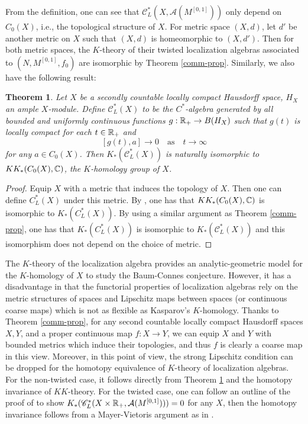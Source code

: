 \documentclass[11pt]{article}
\theoremstyle{definition}
\theoremstyle{plain}
\newtheorem{Thm}[Def]{Theorem}
\def\A{\mathcal A}\def\C{\mathcal C}\def\B{\mathcal B}\def\E{\mathcal E}\def\O{\mathcal O}\def\h{\mathfrak h}\def\K{\mathcal K}\def\F{\mathcal F}\def\P{\mathcal P}\def\L{\mathcal L}\def\R{\mathcal R}\def\Q{\mathcal Q}\def\H{\mathcal H}\def\S{\mathcal S}\def\N{\mathcal N}\def\U{\mathcal U}\def\V{\mathcal V}
\def\sC{\mathscr C}
\begin{document}
\begin{appendices}
From the definition, one can see that $\sC^*_L(X,\A(M^{[0,1]}))$ only depend on $C_0(X)$, i.e., the topological structure of $X$. For metric space $(X,d)$, let $d'$ be another metric on $X$ such that $(X,d)$ is homeomorphic to $(X,d')$. Then for both metric spaces, the $K$-theory of their twisted localization algebras associated to $(N, M^{[0,1]},f_0)$ are isomorphic by Theorem \ref{comm-prop}. Similarly, we also have the following result:

\begin{Thm}\label{non-coe comm-prop}
Let $X$ be a secondly countable locally compact Hausdorff space, $H_X$ an ample $X$-module. Define $\sC^*_L(X)$ to be the $C^*$-algebra generated by all bounded and uniformly continuous functions $g:\mathbb R_+\to B(H_X)$ such that $g(t)$ is locally compact for each $t\in\mathbb R_+$ and
$$[g(t),a]\to 0\quad\text{as}\quad t\to\infty$$
for any $a\in C_0(X)$. Then $K_*(\sC^*_L(X))$ is naturally isomorphic to $KK_*(C_0(X),\mathbb C)$, the $K$-homology group of $X$.
\end{Thm}

\begin{proof}
Equip $X$ with a metric that induces the topology of $X$. Then one can define $C^*_L(X)$ under this metric. By \cite[Theorem 3.5]{QR2010}, one has that $KK_*(C_0(X),\mathbb C)$ is isomorphic to $K_*(C^*_L(X))$. By using a similar argument as Theorem \ref{comm-prop}, one has that $K_*(C^*_L(X))$ is isomorphic to $K_*(\sC^*_L(X))$ and this isomorphism does not depend on the choice of metric.
\end{proof}

The $K$-theory of the localization algebra provides an analytic-geometric model for the $K$-homology of $X$ to study the Baum-Connes conjecture. However, it has a disadvantage in that the functorial properties of localization algebras rely on the metric structures of spaces and Lipschitz maps between spaces (or continuous coarse maps) which is not as flexible as Kasparov's $K$-homology. Thanks to Theorem \ref{comm-prop}, for any second countable locally compact Hausdorff spaces $X, Y$, and a proper continuous map $f: X\to Y$, we can equip $X$ and $Y$ with bounded metrics which induce their topologies, and thus $f$ is clearly a coarse map in this view. Moreover, in this point of view, the strong Lipschitz condition can be dropped for the homotopy equivalence of $K$-theory of localization algebras. For the non-twisted case, it follows directly from Theorem \ref{non-coe comm-prop} and the homotopy invariance of $KK$-theory. For the twisted case, one can follow an outline of the proof of \cite[Proposition 6.4.14]{HIT2020} to show $K_*(\sC^*_L(X\times\IR_+,\A(M^{[0,1]})))=0$ for any $X$, then the homotopy invariance follows from a Mayer-Vietoris argument as in \cite[Theorem 6.4.16]{HIT2020}.


\end{appendices}
\end{document}
